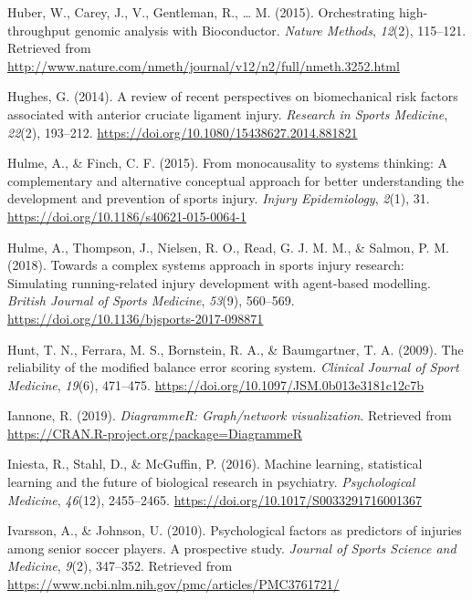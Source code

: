 \documentclass[
  english,
  man,floatsintext]{apa6}
\begin{document}
\leavevmode\hypertarget{ref-R-BiocGenerics}{}%
Huber, W., Carey, J., V., Gentleman, R., \ldots{} M. (2015). Orchestrating high-throughput genomic analysis with Bioconductor. \emph{Nature Methods}, \emph{12}(2), 115--121. Retrieved from \url{http://www.nature.com/nmeth/journal/v12/n2/full/nmeth.3252.html}

\leavevmode\hypertarget{ref-Hughes2014}{}%
Hughes, G. (2014). A review of recent perspectives on biomechanical risk factors associated with anterior cruciate ligament injury. \emph{Research in Sports Medicine}, \emph{22}(2), 193--212. \url{https://doi.org/10.1080/15438627.2014.881821}

\leavevmode\hypertarget{ref-Hulme2015}{}%
Hulme, A., \& Finch, C. F. (2015). From monocausality to systems thinking: A complementary and alternative conceptual approach for better understanding the development and prevention of sports injury. \emph{Injury Epidemiology}, \emph{2}(1), 31. \url{https://doi.org/10.1186/s40621-015-0064-1}

\leavevmode\hypertarget{ref-Hulme2018}{}%
Hulme, A., Thompson, J., Nielsen, R. O., Read, G. J. M. M., \& Salmon, P. M. (2018). Towards a complex systems approach in sports injury research: Simulating running-related injury development with agent-based modelling. \emph{British Journal of Sports Medicine}, \emph{53}(9), 560--569. \url{https://doi.org/10.1136/bjsports-2017-098871}

\leavevmode\hypertarget{ref-Hunt2009}{}%
Hunt, T. N., Ferrara, M. S., Bornstein, R. A., \& Baumgartner, T. A. (2009). The reliability of the modified balance error scoring system. \emph{Clinical Journal of Sport Medicine}, \emph{19}(6), 471--475. \url{https://doi.org/10.1097/JSM.0b013e3181c12c7b}

\leavevmode\hypertarget{ref-R-DiagrammeR}{}%
Iannone, R. (2019). \emph{DiagrammeR: Graph/network visualization}. Retrieved from \url{https://CRAN.R-project.org/package=DiagrammeR}

\leavevmode\hypertarget{ref-Iniesta2016}{}%
Iniesta, R., Stahl, D., \& McGuffin, P. (2016). Machine learning, statistical learning and the future of biological research in psychiatry. \emph{Psychological Medicine}, \emph{46}(12), 2455--2465. \url{https://doi.org/10.1017/S0033291716001367}

\leavevmode\hypertarget{ref-Ivarsson2010}{}%
Ivarsson, A., \& Johnson, U. (2010). Psychological factors as predictors of injuries among senior soccer players. A prospective study. \emph{Journal of Sports Science and Medicine}, \emph{9}(2), 347--352. Retrieved from \url{https://www.ncbi.nlm.nih.gov/pmc/articles/PMC3761721/}
\end{document}
